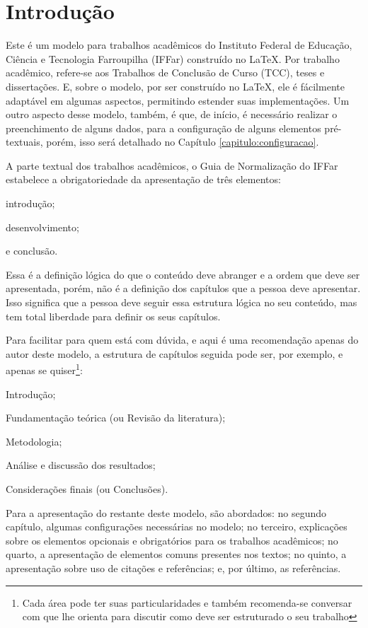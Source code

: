 \chapter{Introdução}
Este é um modelo para trabalhos acadêmicos do Instituto Federal de Educação, Ciência e Tecnologia Farroupilha (IFFar) construído no \LaTeX{}. Por trabalho acadêmico, refere-se aos Trabalhos de Conclusão de Curso (TCC), teses e dissertações. E, sobre o modelo, por ser construído no \LaTeX, ele é fácilmente adaptável em algumas aspectos, permitindo estender suas implementações. Um outro aspecto desse modelo, também, é que, de início, é necessário realizar o preenchimento de alguns dados, para a configuração de alguns elementos pré-textuais, porém, isso será detalhado no Capítulo \ref{capitulo:configuracao}.

A parte textual dos trabalhos acadêmicos, o Guia de Normalização do IFFar estabelece a obrigatoriedade da apresentação de três elementos:
    \begin{alinea}
        \item introdução;
        \item desenvolvimento;
        \item e conclusão.
    \end{alinea}
Essa é a definição lógica do que o conteúdo deve abranger e a ordem que deve ser apresentada, porém, não é a definição dos capítulos que a pessoa deve apresentar. Isso significa que a pessoa deve seguir essa estrutura lógica no seu conteúdo, mas tem total liberdade para definir os seus capítulos. 

Para facilitar para quem está com dúvida, e aqui é uma recomendação apenas do autor deste modelo, a estrutura de capítulos seguida pode ser, por exemplo, e apenas se quiser\footnote{Cada área pode ter suas particularidades e também recomenda-se conversar com que lhe orienta para discutir como deve ser estruturado o seu trabalho}: 
    \begin{alinea}
        \item Introdução;
        \item Fundamentação teórica (ou Revisão da literatura);
        \item Metodologia;
        \item Análise e discussão dos resultados;
        \item Considerações finais (ou Conclusões).
    \end{alinea}

Para a apresentação do restante deste modelo, são abordados: no segundo capítulo, algumas configurações necessárias no modelo; no terceiro, explicações sobre os elementos opcionais e obrigatórios para os trabalhos acadêmicos; no quarto, a apresentação de elementos comuns presentes nos textos; no quinto, a apresentação sobre uso de citações e referências; e, por último, as referências.